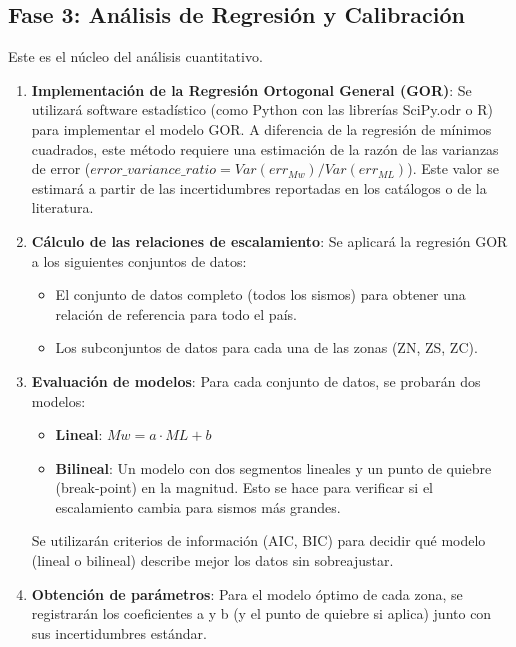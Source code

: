 \documentclass[12pt,a4paper]{article}
\begin{document}
\subsection{Fase 3: Análisis de Regresión y Calibración}
Este es el núcleo del análisis cuantitativo.
\begin{enumerate}
    \item \textbf{Implementación de la Regresión Ortogonal General (GOR)}: Se utilizará software estadístico (como Python con las librerías SciPy.odr o R) para implementar el modelo GOR. A diferencia de la regresión de mínimos cuadrados, este método requiere una estimación de la razón de las varianzas de error ($error\_variance\_ratio = Var(err_{Mw}) / Var(err_{ML})$). Este valor se estimará a partir de las incertidumbres reportadas en los catálogos o de la literatura.
    \item \textbf{Cálculo de las relaciones de escalamiento}: Se aplicará la regresión GOR a los siguientes conjuntos de datos:
        \begin{itemize}
            \item El conjunto de datos completo (todos los sismos) para obtener una relación de referencia para todo el país.
            \item Los subconjuntos de datos para cada una de las zonas (ZN, ZS, ZC).
        \end{itemize}
    \item \textbf{Evaluación de modelos}: Para cada conjunto de datos, se probarán dos modelos:
        \begin{itemize}
            \item \textbf{Lineal}: $Mw = a \cdot ML + b$
            \item \textbf{Bilineal}: Un modelo con dos segmentos lineales y un punto de quiebre (break-point) en la magnitud. Esto se hace para verificar si el escalamiento cambia para sismos más grandes.
        \end{itemize}
        Se utilizarán criterios de información (AIC, BIC) para decidir qué modelo (lineal o bilineal) describe mejor los datos sin sobreajustar.
    \item \textbf{Obtención de parámetros}: Para el modelo óptimo de cada zona, se registrarán los coeficientes a y b (y el punto de quiebre si aplica) junto con sus incertidumbres estándar.
\end{enumerate}
\end{document}
